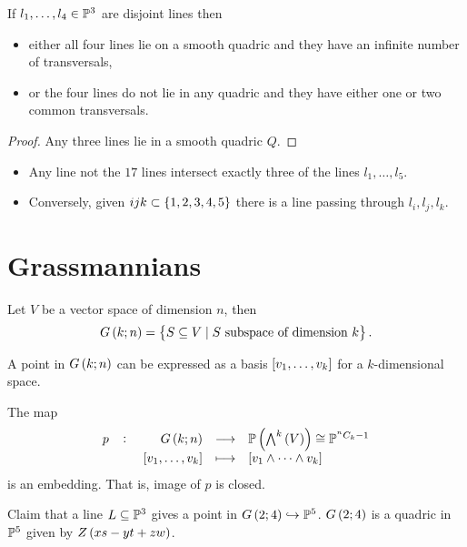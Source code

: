 \begin{lemma}
If $ l_1, \dots, l_4 \in \P^3 $ are disjoint lines then
\begin{itemize}
\item either all four lines lie on a smooth quadric and they have an infinite number of transversals,
\item or the four lines do not lie in any quadric and they have either one or two common transversals.
\end{itemize}
\end{lemma}

\begin{proof}
Any three lines lie in a smooth quadric $ Q $.
\end{proof}

\begin{lemma}
\hfill
\begin{itemize}
\item Any line not the $ 17 $ lines intersect exactly three of the lines $ l_1, \dots, l_5 $.
\item Conversely, given $ ijk \subset \cbr{1, 2, 3, 4, 5} $ there is a line passing through $ l_i, l_j, l_k $.
\end{itemize}
\end{lemma}

\pagebreak

\section{Grassmannians}


\begin{definition}
Let $ V $ be a vector space of dimension $ n $, then
$$ G\br{k; n} = \cbr{S \subseteq V \mid S \ \text{subspace of dimension} \ k}. $$
\end{definition}

\begin{remark}
A point in $ G\br{k; n} $ can be expressed as a basis $ \sbr{v_1, \dots, v_k} $ for a $ k $-dimensional space.
\end{remark}

\begin{theorem}
The map
$$ \function[p]{G\br{k; n}}{\P\br{\bigwedge^k\br{V}} \cong \P^{^nC_k - 1}}{\sbr{v_1, \dots, v_k}}{\sbr{v_1 \wedge \dots \wedge v_k}} $$
is an embedding. That is, image of $ p $ is closed.
\end{theorem}

\begin{example}
Claim that a line $ L \subseteq \P^3 $ gives a point in $ G\br{2; 4} \hookrightarrow \P^5 $. $ G\br{2; 4} $ is a quadric in $ \P^5 $ given by $ Z\br{xs - yt + zw} $.
\end{example}

